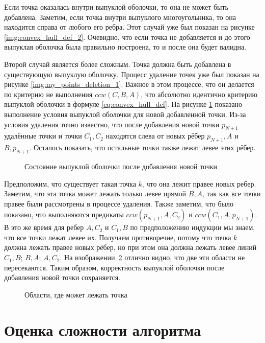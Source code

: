Если точка оказалась внутри выпуклой оболочки, то она не может быть добавлена. Заметим, если точка внутри выпуклого многоугольника, то она находится справа от любого его ребра. Этот случай уже был показан на рисунке \ref{img:convex_hull_def_2}. Очевидно, что если точка не добавляется и до этого выпуклая оболочка была правильно построена, то и после она будет валидна.

Второй случай является более сложным. Точка должна быть добавлена в существующую выпуклую оболочку. Процесс удаление точек уже был показан на рисунке \ref{img:my_points_deletion_1}. Важное в этом процессе, что он делается по критерию не выполнения $ccw(C, B, A)$, что абсолютно идентично критерию выпуклой оболочки в формуле \eqref{eq:convex_hull_def}. На рисунке \ref{img:my_proof_1} показано выполнение условия выпуклой оболочки для новой добавленной точки. Из-за условия удаления точно известно, что после добавления новой точки $p_{N+1}$ удалённые точки и точки $C_1, C_2$ находятся слева от новых рёбер $p_{N+1}, A$ и $B, p_{N+1}$. Осталось показать, что остальные точки также лежат левее этих рёбер.

\begin{figure}[hbt]
	\centering
	
	\caption{Состояние выпуклой оболочки после добавления новой точки}
	\label{img:my_proof_1}
\end{figure}

Предположим, что существует такая точка $k$, что она лежит правее новых ребер. Заметим, что эта точка может лежать только левее прямой $B, A$, так как все точки правее были рассмотрены в процессе удаления. Также заметим, что было показано, что выполняются предикаты $ccw(p_{N+1}, A, C_2)$ и $ccw(C_1, A, p_{N+1})$. В это же время для ребер $A, C_2$ и $C_1, B$ по предположению индукции мы знаем, что все точки лежат левее их. Получаем противоречие, потому что точка $k$ должна лежать правее новых рёбер, но при этом она должна лежать левее линий $C_1, B$; $B, A$; $A, C_2$. На изображении~\ref{img:my_proof_2} отлично видно, что две эти области не пересекаются. Таким образом, корректность выпуклой оболочки после добавления новой точки сохраняется.

\begin{figure}[hbt]
	\centering
	
	\caption{Области, где может лежать точка}
	\label{img:my_proof_2}
\end{figure}

\section{Оценка сложности алгоритма} \label{subsect2_4}

